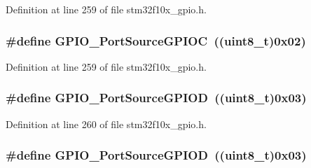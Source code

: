 Definition at line 259 of file stm32f10x\+\_\+gpio.\+h.

\subsubsection[{\texorpdfstring{G\+P\+I\+O\+\_\+\+Port\+Source\+G\+P\+I\+OC}{GPIO_PortSourceGPIOC}}]{\setlength{\rightskip}{0pt plus 5cm}\#define G\+P\+I\+O\+\_\+\+Port\+Source\+G\+P\+I\+OC~(({\bf uint8\+\_\+t})0x02)}\hypertarget{group___g_p_i_o___port___sources_ga7511e96933d503ecf7128ebaff613e7e}{}\label{group___g_p_i_o___port___sources_ga7511e96933d503ecf7128ebaff613e7e}


Definition at line 259 of file stm32f10x\+\_\+gpio.\+h.

\subsubsection[{\texorpdfstring{G\+P\+I\+O\+\_\+\+Port\+Source\+G\+P\+I\+OD}{GPIO_PortSourceGPIOD}}]{\setlength{\rightskip}{0pt plus 5cm}\#define G\+P\+I\+O\+\_\+\+Port\+Source\+G\+P\+I\+OD~(({\bf uint8\+\_\+t})0x03)}\hypertarget{group___g_p_i_o___port___sources_ga68309c29660ae328d3699781520e3d21}{}\label{group___g_p_i_o___port___sources_ga68309c29660ae328d3699781520e3d21}


Definition at line 260 of file stm32f10x\+\_\+gpio.\+h.

\subsubsection[{\texorpdfstring{G\+P\+I\+O\+\_\+\+Port\+Source\+G\+P\+I\+OD}{GPIO_PortSourceGPIOD}}]{\setlength{\rightskip}{0pt plus 5cm}\#define G\+P\+I\+O\+\_\+\+Port\+Source\+G\+P\+I\+OD~(({\bf uint8\+\_\+t})0x03)}\hypertarget{group___g_p_i_o___port___sources_ga68309c29660ae328d3699781520e3d21}{}\label{group___g_p_i_o___port___sources_ga68309c29660ae328d3699781520e3d21}


